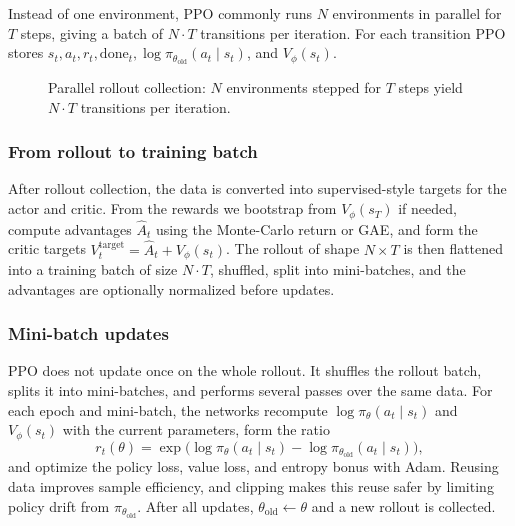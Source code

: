 \documentclass{article}
\begin{document}
Instead of one environment, PPO commonly runs $N$ environments in parallel for $T$ steps, giving a batch of $N\cdot T$ transitions per iteration. For each transition PPO stores $s_t, a_t, r_t, \text{done}_t, \log\pi_{\theta_{\mathrm{old}}}(a_t\mid s_t)$, and $V_\phi(s_t)$.

\begin{figure}[H]
  \centering
  \caption{Parallel rollout collection: $N$ environments stepped for $T$ steps yield $N\cdot T$ transitions per iteration.}
  \label{fig:parallel-rollout}
\end{figure}

\subsubsection{From rollout to training batch}

After rollout collection, the data is converted into supervised-style targets for the actor and critic. From the rewards we bootstrap from $V_\phi(s_T)$ if needed, compute advantages $\hat{A}_t$ using the Monte-Carlo return or GAE, and form the critic targets $V_t^{\mathrm{target}} = \hat{A}_t + V_\phi(s_t)$. The rollout of shape $N\times T$ is then flattened into a training batch of size $N\cdot T$, shuffled, split into mini-batches, and the advantages are optionally normalized before updates.

\subsubsection{Mini-batch updates}

PPO does not update once on the whole rollout. It shuffles the rollout batch, splits it into mini-batches, and performs several passes over the same data. For each epoch and mini-batch, the networks recompute $\log\pi_\theta(a_t\mid s_t)$ and $V_\phi(s_t)$ with the current parameters, form the ratio
\[
  r_t(\theta) = \exp\bigl(\log\pi_\theta(a_t\mid s_t) - \log\pi_{\theta_{\mathrm{old}}}(a_t\mid s_t)\bigr),
\]
and optimize the policy loss, value loss, and entropy bonus with Adam. Reusing data improves sample efficiency, and clipping makes this reuse safer by limiting policy drift from $\pi_{\theta_{\mathrm{old}}}$. After all updates, $\theta_{\mathrm{old}} \leftarrow \theta$ and a new rollout is collected.
\end{document}
